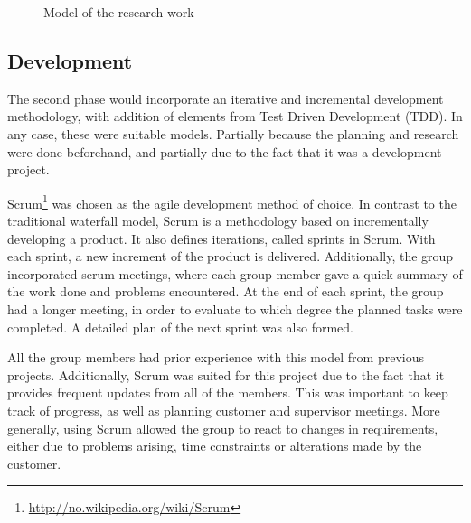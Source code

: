 \begin{center}
  \begin{figure}[ht!]
    \caption{Model of the research work}
    \label{fig:phasegate}
  \end{figure}
\end{center}

\subsection{Development}

The second phase would incorporate an iterative and incremental development methodology, with addition of elements from Test Driven Development (TDD). In any case, these were suitable models. Partially because the planning and research were done beforehand, and partially due to the fact that it was a development project.

Scrum\footnote{\url{http://no.wikipedia.org/wiki/Scrum}} was chosen as the agile development method of choice. In contrast to the traditional waterfall model, Scrum is a methodology based on incrementally developing a product. It also defines iterations, called sprints in Scrum. With each sprint, a new increment of the product is delivered. Additionally, the group incorporated scrum meetings, where each group member gave a quick summary of the work done and problems encountered. At the end of each sprint, the group had a longer meeting, in order to evaluate to which degree the planned tasks were completed. A detailed plan of the next sprint was also formed.

All the group members had prior experience with this model from previous projects. Additionally, Scrum was suited for this project due to the fact that it provides frequent updates from all of the members. This was important to keep track of progress, as well as planning customer and supervisor meetings. More generally, using Scrum allowed the group to react to changes in requirements, either due to problems arising, time constraints or alterations made by the customer.

